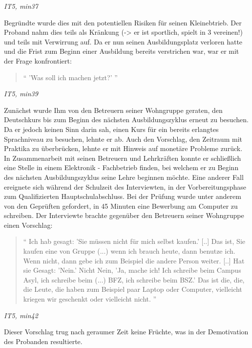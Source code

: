 \centerline{\textit{IT5, min37}}
Begründte wurde dies mit den potentiellen Risiken für seinen Kleinebtrieb. Der Proband nahm dies teils als Kränkung (-> er ist sportlich, spielt in 3 vereinen!) und teils mit Verwirrung auf.\newline
Da er nun seinen Ausbildungsplatz verloren hatte und die Frist zum Beginn einer Ausbildung bereits verstrichen war, war er mit der Frage konfrontiert:
\begin{quote}
    `` 'Was soll ich machen jetzt?' ''
\end{quote}
\centerline{\textit{IT5, min39}}
Zunächst wurde Ihm von den Betreuern seiner Wohngruppe geraten, den Deutschkurs bis zum Beginn des nächsten Ausbildungszyklus erneut zu besuchen. Da er jedoch keinen Sinn darin sah, einen Kurs für ein bereits erlangtes Sprachniveau zu besuchen, lehnte er ab. Auch den Vorschlag, den Zeitraum mit Praktika zu überbrücken, lehnte er mit Hinweis auf monetäre Probleme zurück.\newline
In Zusammenarbeit mit seinen Betreuern und Lehrkräften konnte er schließlich eine Stelle in einem Elektronik - Fachbetrieb finden, bei welchem er zu Beginn des nächsten Ausbildungszyklus seine Lehre beginnen möchte.\newline
Eine anderer Fall ereignete sich während der Schulzeit des Interviewten, in der Vorbereitungsphase zum Qualifizierten Hauptschulabschluss. Bei der Prüfung wurde unter anderem von den Geprüften gefordert, in 45 Minuten eine Bewerbung am Computer zu schreiben.
Der Interviewte brachte gegenüber den Betreuern seiner Wohngruppe einen Vorschlag:
\begin{quote}
    `` Ich hab gesagt: 'Sie müssen nicht für mich selbst kaufen.' [..] Das ist, Sie kaufen eine von Gruppe (...) wenn ich brauch heute, dann benutze ich. Wenn nicht, dann gebe ich zum Beispiel die andere Person weiter. [..] Hat sie Gesagt: 'Nein.' Nicht Nein, 'Ja, mache ich! Ich schreibe beim Campus Asyl, ich schreibe beim (...) BFZ, ich schreibe beim BSZ.' Das ist die, die, die Leute, die haben zum Beispiel paar Laptop oder Computer, vielleicht kriegen wir geschenkt oder vielleicht nicht. ''
\end{quote}
\centerline{\textit{IT5, min42}}
Dieser Vorschlag trug nach geraumer Zeit keine Früchte, was in der Demotivation des Probanden resultierte.
